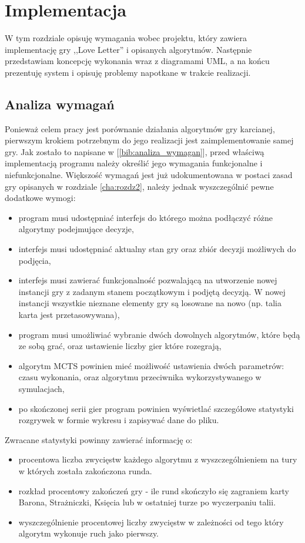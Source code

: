 \chapter{Implementacja}
\label{cha:rozdz4}

W tym rozdziale opisuję wymagania wobec projektu, który zawiera implementację gry ,,Love Letter'' i opisanych algorytmów. Następnie przedstawiam koncepcję wykonania wraz z diagramami UML, a na końcu prezentuję system i opisuję problemy napotkane w trakcie realizacji.

\section{Analiza wymagań}
Ponieważ celem pracy jest porównanie działania algorytmów gry karcianej, pierwszym krokiem potrzebnym do jego realizacji jest zaimplementowanie samej gry. Jak zostało to napisane w [\ref{bib:analiza_wymagan}], przed właściwą implementacją programu należy określić jego wymagania funkcjonalne i niefunkcjonalne. Większość wymagań jest już udokumentowana w postaci zasad gry opisanych w rozdziale \ref{cha:rozdz2}, należy jednak wyszczególnić pewne dodatkowe wymogi:
\begin{itemize}
	\item program musi udostępniać interfejs do którego można podłączyć różne algorytmy podejmujące decyzje,
	\item interfejs musi udostępniać aktualny stan gry oraz zbiór decyzji możliwych do podjęcia,
	\item interfejs musi zawierać funkcjonalność pozwalającą na utworzenie nowej instancji gry z zadanym stanem początkowym i podjętą decyzją. W nowej instancji wszystkie nieznane elementy gry są losowane na nowo (np. talia karta jest przetasowywana),
	\item program musi umożliwiać wybranie dwóch dowolnych algorytmów, które będą ze sobą grać, oraz ustawienie liczby gier które rozegrają,
	\item algorytm MCTS powinien mieć możliwość ustawienia dwóch parametrów: czasu wykonania, oraz algorytmu przeciwnika wykorzystywanego w symulacjach,
	\item po skończonej serii gier program powinien wyświetlać szczegółowe statystyki rozgrywek w formie wykresu i zapisywać dane do pliku.
\end{itemize}
Zwracane statystyki powinny zawierać informację o:
\begin{itemize}
	\item procentowa liczba zwycięstw każdego algorytmu z wyszczególnieniem na tury w których została zakończona runda.
	\item rozkład procentowy zakończeń gry - ile rund skończyło się zagraniem karty Barona, Strażniczki, Księcia lub w ostatniej turze po wyczerpaniu talii.
	\item wyszczególnienie procentowej liczby zwycięstw w zależności od tego który algorytm wykonuje ruch jako pierwszy.
\end{itemize}

